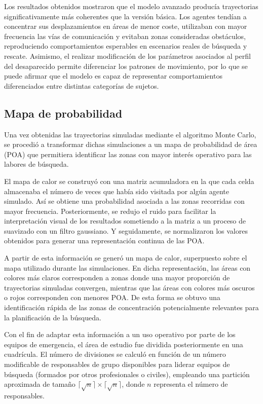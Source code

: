 Los resultados obtenidos mostraron que el modelo avanzado producía trayectorias significativamente más coherentes que la versión básica. Los agentes tendían a concentrar sus desplazamientos en áreas de menor coste, utilizaban con mayor frecuencia las vías de comunicación y evitaban zonas consideradas obstáculos, reproduciendo comportamientos esperables en escenarios reales de búsqueda y rescate. Asimismo, el realizar modificación de los parámetros asociados al perfil del desaparecido permite diferenciar los patrones de movimiento, por lo que se puede afirmar que el modelo es capaz de representar comportamientos diferenciados entre distintas categorías de sujetos.

\subsection{Mapa de probabilidad}

Una vez obtenidas las trayectorias simuladas mediante el algoritmo Monte Carlo, se procedió a transformar dichas simulaciones a un mapa de probabilidad de área (POA) que permitiera identificar las zonas con mayor interés operativo para las labores de búsqueda.

El mapa de calor se construyó con una matriz acumuladora en la que cada celda almacenaba el número de veces que había sido visitada por algún agente simulado. Así se obtiene una probabilidad asociada a las zonas recorridas con mayor frecuencia. Posteriormente, se redujo el ruido para facilitar la interpretación visual de los resultados sometiendo a la matriz a un proceso de suavizado con un filtro gaussiano. Y seguidamente, se normalizaron los valores obtenidos para generar una representación continua de las POA.

A partir de esta información se generó un mapa de calor, superpuesto sobre el mapa utilizado durante las simulaciones. En dicha representación, las áreas con colores más claros corresponden a zonas donde una mayor proporción de trayectorias simuladas convergen, mientras que las áreas con colores más oscuros o rojos corresponden con menores POA. De esta forma se obtuvo una identificación rápida de las zonas de concentración potencialmente relevantes para la planificación de la búsqueda.


Con el fin de adaptar esta información a un uso operativo por parte de los equipos de emergencia, el área de estudio fue dividida posteriormente en una cuadrícula. El número de divisiones se calculó en función de un número modificable de responsables de grupo disponibles para liderar equipos de búsqueda (formados por otros profesionales o civiles), empleando una partición aproximada de tamaño $\lceil\sqrt{n}\rceil \times \lceil\sqrt{n}\rceil$, donde $n$ representa el número de responsables.

